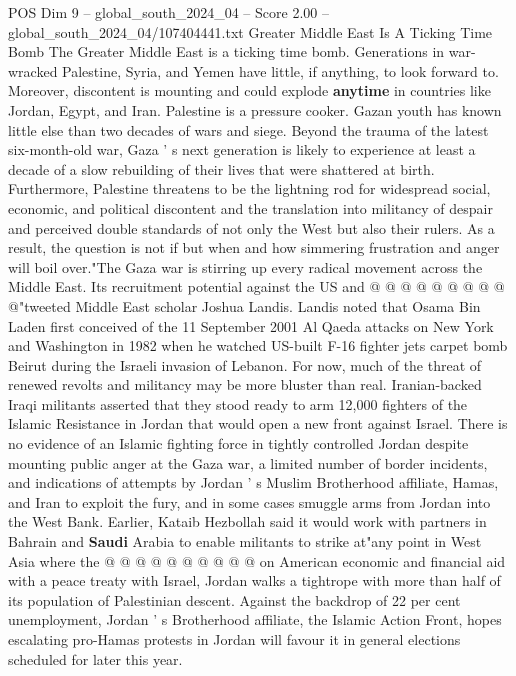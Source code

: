 \begin{textsample}{POS Dim 9 – global\_south\_2024\_04 – Score 2.00 – global\_south\_2024\_04/107404441.txt}  \label{ex:f9_pos_116}
Greater Middle East Is A Ticking Time Bomb The Greater Middle East is a ticking time bomb.
Generations in war-wracked Palestine, Syria, and Yemen have little, if anything, to look forward to.
Moreover, discontent is mounting and could explode \textbf{anytime} in countries like Jordan, Egypt, and Iran.
Palestine is a pressure cooker.
Gazan youth has known little else than two decades of wars and siege.
Beyond the trauma of the latest six-month-old war, Gaza ' s next generation is likely to experience at least a decade of a slow rebuilding of their lives that were shattered at birth.
Furthermore, Palestine threatens to be the lightning rod for widespread social, economic, and political discontent and the translation into militancy of despair and perceived double standards of not only the West but also their rulers.
As a result, the question is not if but when and how simmering frustration and anger will boil over."The Gaza war is stirring up every radical movement across the Middle East.
Its recruitment potential against the US and @ @ @ @ @ @ @ @ @ @"tweeted Middle East scholar Joshua Landis.
Landis noted that Osama Bin Laden first conceived of the 11 September 2001 Al Qaeda attacks on New York and Washington in 1982 when he watched US-built F-16 fighter jets carpet bomb Beirut during the Israeli invasion of Lebanon.
For now, much of the threat of renewed revolts and militancy may be more bluster than real.
Iranian-backed Iraqi militants asserted that they stood ready to arm 12,000 fighters of the Islamic Resistance in Jordan that would open a new front against Israel.
There is no evidence of an Islamic fighting force in tightly controlled Jordan despite mounting public anger at the Gaza war, a limited number of border incidents, and indications of attempts by Jordan ' s Muslim Brotherhood affiliate, Hamas, and Iran to exploit the fury, and in some cases smuggle arms from Jordan into the West Bank.
Earlier, Kataib Hezbollah said it would work with partners in Bahrain and \textbf{Saudi} Arabia to enable militants to strike at"any point in West Asia where the @ @ @ @ @ @ @ @ @ @ on American economic and financial aid with a peace treaty with Israel, Jordan walks a tightrope with more than half of its population of Palestinian descent.
Against the backdrop of 22 per cent unemployment, Jordan ' s Brotherhood affiliate, the Islamic Action Front, hopes escalating pro-Hamas protests in Jordan will favour it in general elections scheduled for later this year.

\end{textsample}

